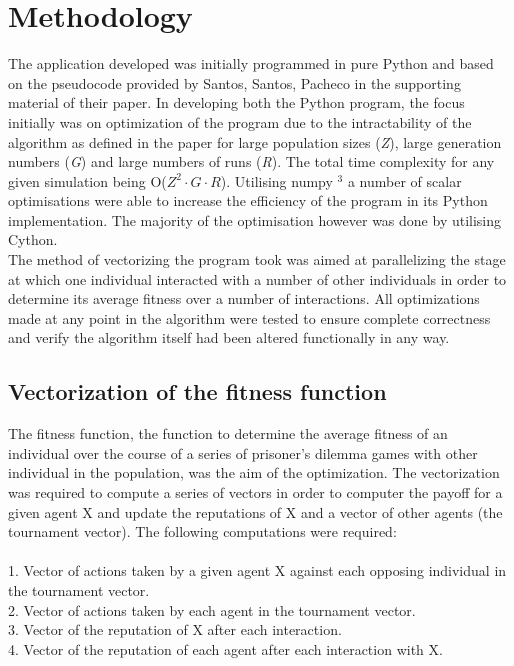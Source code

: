 \documentclass[10pt,a4paper]{article}
\begin{document}
\section{Methodology}
The application developed was initially programmed in pure Python and based on the pseudocode provided by Santos, Santos, Pacheco in the supporting material of their paper.
In developing both the Python program, the focus initially was on optimization of the program due to the intractability of the algorithm as defined in the paper for large population sizes (\emph{Z}), large generation numbers (\emph{G}) and large numbers of runs (\emph{R}).
The total time complexity for any given simulation being O(\emph{$Z^{2} \cdot G\cdot R$}).
Utilising numpy $^{3}$ a number of scalar optimisations were able to increase the efficiency of the program in its Python implementation. 
The majority of the optimisation however was done by utilising Cython.
\\
The method of vectorizing the program took was aimed at parallelizing the stage at which one individual interacted with a number of other individuals in order to determine its average fitness over a number of interactions. 
All optimizations made at any point in the algorithm were tested to ensure complete correctness and verify the algorithm itself had been altered functionally in any way.
\subsection{Vectorization of the fitness function}
The fitness function, the function to determine the average fitness of an individual over the course of a series of prisoner's dilemma games with other individual in the population, was the aim of the optimization. 
The vectorization was required to compute a series of vectors in order to computer the payoff for a given agent X and update the reputations of X and a vector of other agents (the tournament vector).
The following computations were required:
\\
\\ 1. Vector of actions taken by a given agent X against each opposing individual in the tournament vector.
\\ 2. Vector of actions taken by each agent in the tournament vector.
\\ 3. Vector of the reputation of X after each interaction.
\\ 4. Vector of the reputation of each agent after each interaction with X. \\\\
\end{document}
